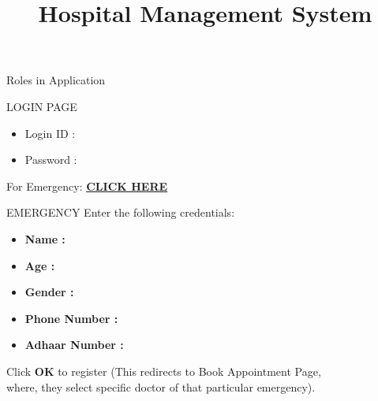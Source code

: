 \documentclass{beamer}
\title{Hospital Management System}
\begin{document}
\begin{frame}
    \titlepage 
\end{frame}

\logo{}


\begin{frame}{Roles in Application}
    \tableofcontents
\end{frame}

\begin{frame}{LOGIN PAGE}
	\begin{itemize}
	\item Login ID :
	\item Password :
	\end{itemize}
For Emergency: \underline{\textbf{CLICK HERE}}
\end{frame}

\begin{frame}{EMERGENCY}
Enter the following credentials:
\begin{itemize}
\item \textbf{Name :}
\item \textbf{Age :}
\item \textbf{Gender :}
\item \textbf{Phone Number :}
\item \textbf{Adhaar Number :}
\end{itemize}
Click \textbf{OK} to register (This redirects to Book Appointment Page,\\
	where, they select specific doctor of that particular emergency).
\end{frame}


\end{document}

